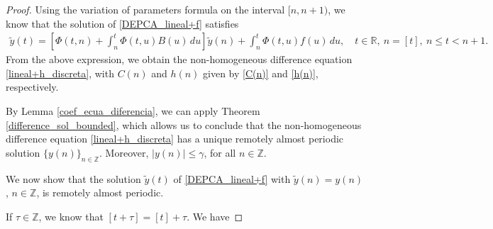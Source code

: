 \documentclass[english,,reqno]{amsart}
\numberwithin{equation}{section}
\theoremstyle{plain}
\theoremstyle{definition}
\theoremstyle{remark}
\begin{document}
\begin{proof}
Using the variation of parameters formula on the interval $[n, n+1)$, we know that the solution of \eqref{DEPCA_lineal+f} satisfies  
\begin{eqnarray*}
\tilde{y}(t) = \left[\Phi(t,n) + \int_{n}^{t} \Phi(t,u) B(u)\,du \right] \tilde{y}(n) + \int_{n}^{t} \Phi(t,u) f(u)\,du, \quad t \in \mathbb{R},\ n = [t],\ n \leq t < n+1.
\end{eqnarray*}  
From the above expression, we obtain the non-homogeneous difference equation \eqref{lineal+h_discreta}, with $C(n)$ and $h(n)$ given by \eqref{C(n)} and \eqref{h(n)}, respectively.  

By Lemma \ref{coef_ecua_diferencia}, we can apply Theorem \ref{difference_sol_bounded}, which allows us to conclude that the non-homogeneous difference equation \eqref{lineal+h_discreta} has a unique remotely almost periodic solution $\{y(n)\}_{n \in \mathbb{Z}}$.  
Moreover, $|y(n)| \leq \gamma$, for all $n \in \mathbb{Z}$.

We now show that the solution $\tilde{y}(t)$ of \eqref{DEPCA_lineal+f} with $\tilde{y}(n) = y(n)$, $n \in \mathbb{Z}$, is remotely almost periodic.

If $\tau \in \mathbb{Z}$, we know that $[t + \tau] = [t] + \tau$. We have


\end{proof}
\end{document}

